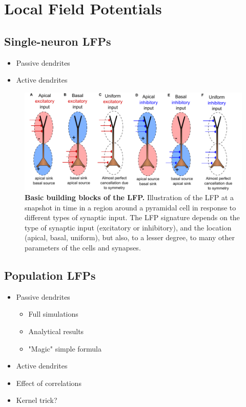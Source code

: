 \section{Local Field Potentials}

\subsection{Single-neuron LFPs}
\begin{itemize}
\item Passive dendrites \citep{Linden2010}
\item Active dendrites \citep{Ness2016}
\end{itemize}

\begin{figure}[!ht]
\begin{center}
\includegraphics[width=1.\textwidth]{Figures/dipole_basics.pdf}
\end{center}
\caption{\textbf{Basic building blocks of the LFP.}
Illustration of the LFP at a snapshot in time in a region around a pyramidal
cell in response to different types of synaptic input. The LFP signature depends on the type of synaptic input (excitatory
or inhibitory), and the location (apical, basal, uniform), but also, to a lesser degree, to many other parameters of the cells
and synapses.
}
\label{fig:LFP_lego}
\end{figure}

\subsection{Population LFPs}
\begin{itemize}
\item Passive dendrites 
\begin{itemize}
\item Full simulations \citep{Linden2011,Leski2013}
\item Analytical results~\citep{Einevoll2013a}
\item "Magic" simple formula \citep{Mazzoni2015}
\end{itemize}
\item Active dendrites \citep{Ness2018}
\item Effect of correlations
\item Kernel trick? 
\end{itemize}

